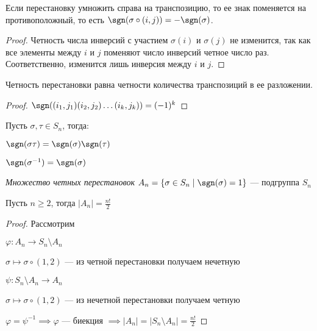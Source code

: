 \begin{lemma}
    Если перестановку умножить справа на транспозицию, то ее знак поменяется на противоположный, то есть $\sgn(\sigma \circ (i, j)) = -\sgn(\sigma)$.
\end{lemma}

\begin{proof}
    Четность числа инверсий с участием $\sigma(i)$ и $\sigma(j)$ не изменится, так как все элементы между $i$ и $j$ поменяют число инверсий четное число раз. Соответственно, изменится лишь инверсия между $i$ и $j$.
\end{proof}

\begin{follow}
    Четность перестановки равна четности количества транспозиций в ее разложении.
\end{follow}

\begin{proof}
    $\sgn((i_1, j_1) (i_2, j_2) \ldots (i_k, j_k)) = (-1)^k$
\end{proof}

\begin{follow} 
    Пусть $\sigma, \tau \in S_n$, тогда:

    $\sgn(\sigma \tau) = \sgn(\sigma) \sgn(\tau)$

    $\sgn(\sigma ^{-1}) = \sgn(\sigma)$
\end{follow}

\begin{defn}
    \emph{Множество четных перестановок} $A_n = \{\sigma \in S_n \mid \sgn(\sigma) = 1\}$ --- подгруппа $S_n$
\end{defn}

\begin{theorem-non}
    Пусть $n \geq 2$, тогда $|A_n| = \frac{n!}{2}$ 
\end{theorem-non}

\begin{proof}
    Рассмотрим 

    $\varphi: A_n \to S_n \setminus A_n$
    
    $\sigma \mapsto \sigma \circ (1, 2)$ --- из четной перестановки получаем нечетную

    $\psi: S_n \setminus A_n \to A_n$

    $\sigma \mapsto \sigma \circ (1, 2)$ --- из нечетной перестановки получаем четную

    $\varphi = \psi^{-1} \implies \varphi$ --- биекция $\implies |A_n| = |S_n \setminus A_n| = \frac{n!}{2}$
\end{proof}